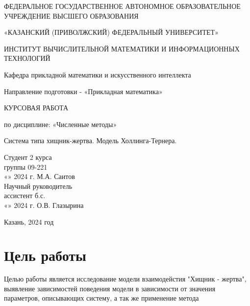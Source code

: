 \documentclass[a4paper,12pt]{article}
\begin{document}
\renewcommand\contentsname{Содержание}
\renewcommand{\arraystretch}{1.3} 
\thispagestyle{empty}
\begin{center}
    ФЕДЕРАЛЬНОЕ ГОСУДАРСТВЕННОЕ АВТОНОМНОЕ ОБРАЗОВАТЕЛЬНОЕ
    УЧРЕЖДЕНИЕ ВЫСШЕГО ОБРАЗОВАНИЯ
    \vspace{0.1cm}

    «КАЗАНСКИЙ (ПРИВОЛЖСКИЙ)  ФЕДЕРАЛЬНЫЙ УНИВЕРСИТЕТ»
    \vspace{0.1cm}

    ИНСТИТУТ ВЫЧИСЛИТЕЛЬНОЙ МАТЕМАТИКИ И ИНФОРМАЦИОННЫХ ТЕХНОЛОГИЙ

    Кафедра прикладной математики и искусственного интеллекта

    Направление подготовки - «Прикладная математика»
\end{center}
\vspace{2cm}

\begin{center}
    КУРСОВАЯ РАБОТА
    \vspace{0.2cm}
 
    по дисциплине: «Численные методы»
    \vspace{0.2cm}
 
    Система типа хищник-жертва. Модель Холлинга-Тернера.
\end{center}

\vspace{3cm}
\noindent Студент 2 курса\\
группы 09-221\\
«\underline{\qquad}» \underline{\qquad\qquad} 2024 г. \qquad\qquad\quad \underline{\qquad\qquad\qquad\quad} \qquad М.А. Саитов\\
Научный руководитель\\
ассистент б.с.\\
«\underline{\qquad}» \underline{\qquad\qquad} 2024 г. \qquad\qquad\quad \underline{\qquad\qquad\qquad\quad} \qquad О.В. Глазырина

\vfill
\begin{center} \large{Казань, 2024 год} \end{center}
\thispagestyle{empty}
 

\newpage
\begin{center}
\renewcommand{\contentsname}{Содержание}
\fontsize{14}{1.15}\selectfont
\mdseries\selectfont{\tableofcontents}
\newpage
\end{center}
\setlength{\parindent}{1.25cm}
\newpage

\section{Цель работы}
\hspace{0.5cm} Целью работы является исследование модели взаимодейстия "Хищник - жертва",
выявление зависимостей поведения модели в зависимости от значения параметров,
описывающих систему, а так же применение метода
\newpage
\end{document}
